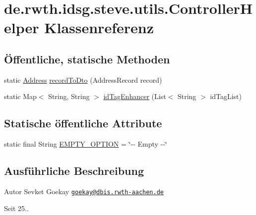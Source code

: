 \hypertarget{classde_1_1rwth_1_1idsg_1_1steve_1_1utils_1_1_controller_helper}{\section{de.\-rwth.\-idsg.\-steve.\-utils.\-Controller\-Helper Klassenreferenz}
\label{classde_1_1rwth_1_1idsg_1_1steve_1_1utils_1_1_controller_helper}
}
\subsection*{Öffentliche, statische Methoden}
\begin{DoxyCompactItemize}
\item 
static \hyperlink{classde_1_1rwth_1_1idsg_1_1steve_1_1web_1_1dto_1_1_address}{Address} \hyperlink{classde_1_1rwth_1_1idsg_1_1steve_1_1utils_1_1_controller_helper_a49bb49e4372a76b9ff9f12706c8aa548}{record\-To\-Dto} (Address\-Record record)
\item 
static Map$<$ String, String $>$ \hyperlink{classde_1_1rwth_1_1idsg_1_1steve_1_1utils_1_1_controller_helper_a30c039cffd35900ddc93ebfdd5f23c22}{id\-Tag\-Enhancer} (List$<$ String $>$ id\-Tag\-List)
\end{DoxyCompactItemize}
\subsection*{Statische öffentliche Attribute}
\begin{DoxyCompactItemize}
\item 
static final String \hyperlink{classde_1_1rwth_1_1idsg_1_1steve_1_1utils_1_1_controller_helper_a109b68c4123f4c253f29673721e3382b}{E\-M\-P\-T\-Y\-\_\-\-O\-P\-T\-I\-O\-N} = \char`\"{}-\/-\/ Empty -\/-\/\char`\"{}
\end{DoxyCompactItemize}


\subsection{Ausführliche Beschreibung}
\begin{DoxyAuthor}{Autor}
Sevket Goekay \href{mailto:goekay@dbis.rwth-aachen.de}{\tt goekay@dbis.\-rwth-\/aachen.\-de} 
\end{DoxyAuthor}
\begin{DoxySince}{Seit}
25.. 
\end{DoxySince}


